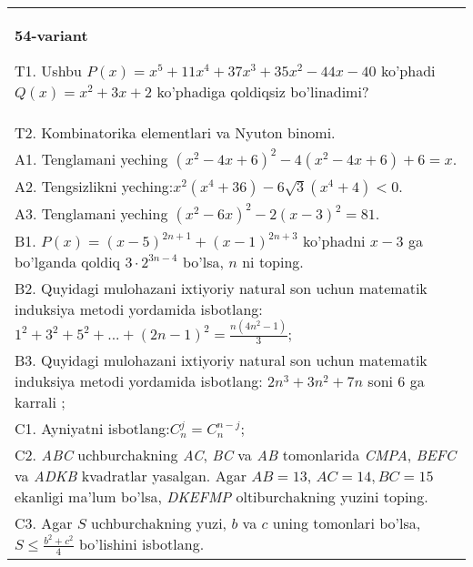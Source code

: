\documentclass{article}
\begin{document}
\begin{tabular}{m{17cm}}
\textbf{54-variant}
\newline

T1. Ushbu \(P(x) = x^{5} + 11x^{4} + 37x^{3} + 35x^{2} - 44x - 40\) ko'phadi \(Q(x) = x^{2} + 3x + 2\) ko'phadiga qoldiqsiz bo'linadimi? \\
T2. Kombinatorika elementlari va Nyuton binomi. \\
A1. Tenglamani yeching \(\left( x^{2} - 4x + 6 \right)^{2} - 4\left( x^{2} - 4x + 6 \right) + 6 = x\). \\
A2. Tengsizlikni yeching:\(x^{2}\left( x^{4} + 36 \right) - 6\sqrt{3}\left( x^{4} + 4 \right) < 0\). \\
A3. Tenglamani yeching \(\left( x^{2} - 6x \right)^{2} - 2(x - 3)^{2} = 81\). \\
B1. \(P(x) = (x - 5)^{2n + 1} + (x - 1)^{2n + 3}\) ko'phadni \(x - 3\) ga bo'lganda qoldiq \(3 \cdot 2^{3n - 4}\) bo'lsa, \(n\) ni toping. \\
B2. Quyidagi mulohazani ixtiyoriy natural son uchun matematik induksiya metodi yordamida isbotlang: \(1^{2} + 3^{2} + 5^{2} + ... + (2n - 1)^{2} = \frac{n\left( 4n^{2} - 1 \right)}{3}\); \\
B3. Quyidagi mulohazani ixtiyoriy natural son uchun matematik induksiya metodi yordamida isbotlang: \(2n^{3} + 3n^{2} + 7n\) soni 6 ga karrali ; \\
C1. Ayniyatni isbotlang:\(C_{n}^{j} = C_{n}^{n - j}\); \\
C2. \emph{ABC} uchburchakning \emph{AC}, \emph{BC} va \emph{AB} tomonlarida \emph{CMPA}, \emph{BEFC} va \emph{ADKB} kvadratlar yasalgan. Agar \(AB = 13\), \(AC = 14,BC = 15\) ekanligi ma'lum bo'lsa, \emph{DKEFMP} oltiburchakning yuzini toping. \\
C3. Agar \(S\) uchburchakning yuzi, \(b\) va \(c\) uning tomonlari bo'lsa, \(S \leq \frac{b^{2} + c^{2}}{4}\) bo'lishini isbotlang. \\

\end{tabular}
\vspace{1cm}
\end{document}
